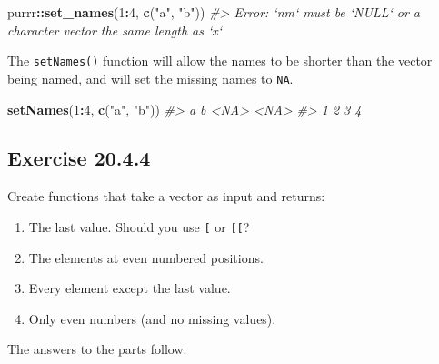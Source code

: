 \documentclass[]{book}
\newenvironment{Shaded}{\begin{snugshade}}{\end{snugshade}}
\newcommand{\CommentTok}[1]{\textcolor[rgb]{0.56,0.35,0.01}{\textit{#1}}}
\newcommand{\DecValTok}[1]{\textcolor[rgb]{0.00,0.00,0.81}{#1}}
\newcommand{\KeywordTok}[1]{\textcolor[rgb]{0.13,0.29,0.53}{\textbf{#1}}}
\newcommand{\NormalTok}[1]{#1}
\newcommand{\OperatorTok}[1]{\textcolor[rgb]{0.81,0.36,0.00}{\textbf{#1}}}
\newcommand{\StringTok}[1]{\textcolor[rgb]{0.31,0.60,0.02}{#1}}
\providecommand{\tightlist}{%
  \setlength{\itemsep}{0pt}\setlength{\parskip}{0pt}}
\theoremstyle{plain}
\theoremstyle{remark}
\begin{document}
\begin{Shaded}
\begin{Highlighting}[]
\NormalTok{purrr}\OperatorTok{::}\KeywordTok{set_names}\NormalTok{(}\DecValTok{1}\OperatorTok{:}\DecValTok{4}\NormalTok{, }\KeywordTok{c}\NormalTok{(}\StringTok{"a"}\NormalTok{, }\StringTok{"b"}\NormalTok{))}
\CommentTok{#> Error: `nm` must be `NULL` or a character vector the same length as `x`}
\end{Highlighting}
\end{Shaded}

The \texttt{setNames()} function will allow the names to be shorter than
the vector being named, and will set the missing names to \texttt{NA}.

\begin{Shaded}
\begin{Highlighting}[]
\KeywordTok{setNames}\NormalTok{(}\DecValTok{1}\OperatorTok{:}\DecValTok{4}\NormalTok{, }\KeywordTok{c}\NormalTok{(}\StringTok{"a"}\NormalTok{, }\StringTok{"b"}\NormalTok{))}
\CommentTok{#>    a    b <NA> <NA> }
\CommentTok{#>    1    2    3    4}
\end{Highlighting}
\end{Shaded}

\hypertarget{exercise-20.4.4}{%
\subsection*{\texorpdfstring{Exercise
{20.4.4}}{Exercise 20.4.4}}\label{exercise-20.4.4}}

Create functions that take a vector as input and returns:

\begin{enumerate}
\def\labelenumi{\arabic{enumi}.}
\tightlist
\item
  The last value. Should you use \texttt{{[}} or \texttt{{[}{[}}?
\item
  The elements at even numbered positions.
\item
  Every element except the last value.
\item
  Only even numbers (and no missing values).
\end{enumerate}

The answers to the parts follow.
\end{document}
